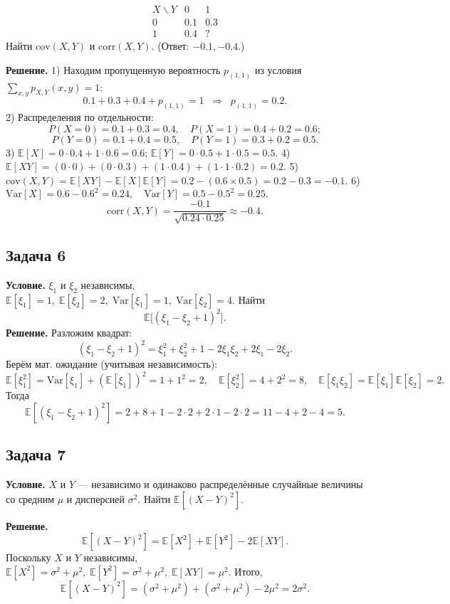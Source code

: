 \documentclass[12pt]{article}
\begin{document}
\[
\begin{array}{c|cc}
X\backslash Y & 0 & 1 \\
\hline
0 & 0.1 & 0.3 \\
1 & 0.4 & ? 
\end{array}
\]
Найти \(\mathrm{cov}(X, Y)\) и \(\mathrm{corr}(X, Y)\). (Ответ: \(-0.1, -0.4\).)

\textbf{Решение.}  
1) Находим пропущенную вероятность \(p_{(1,1)}\) из условия \(\sum_{x,y} p_{X,Y}(x,y)=1\):
\[
0.1 + 0.3 + 0.4 + p_{(1,1)} = 1 \;\;\Rightarrow\;\; p_{(1,1)}=0.2.
\]
2) Распределения по отдельности:
\[
P(X=0)=0.1+0.3=0.4,\quad P(X=1)=0.4+0.2=0.6;
\]
\[
P(Y=0)=0.1+0.4=0.5,\quad P(Y=1)=0.3+0.2=0.5.
\]
3) \(\mathbb{E}[X]=0\cdot0.4+1\cdot0.6=0.6\); \(\mathbb{E}[Y]=0\cdot0.5+1\cdot0.5=0.5\).  
4) \(\mathbb{E}[XY]= (0\cdot0)+(0\cdot0.3)+(1\cdot0.4)+(1\cdot1\cdot0.2)=0.2.\)  
5) \(\mathrm{cov}(X,Y) = \mathbb{E}[XY] - \mathbb{E}[X]\mathbb{E}[Y] = 0.2 - (0.6\times0.5)=0.2-0.3=-0.1.\)  
6) \(\mathrm{Var}[X]=0.6-0.6^2=0.24,\quad \mathrm{Var}[Y]=0.5-0.5^2=0.25.\)  
\[
\mathrm{corr}(X,Y)=\frac{-0.1}{\sqrt{0.24\cdot0.25}}\approx -0.4.
\]

\subsection*{Задача 6}
\textbf{Условие.} \(\xi_1\) и \(\xi_2\) независимы, \(\mathbb{E}[\xi_1]=1,\;\mathbb{E}[\xi_2]=2,\;\mathrm{Var}[\xi_1]=1,\;\mathrm{Var}[\xi_2]=4.\) Найти
\[
\mathbb{E}\bigl[(\xi_1-\xi_2+1)^2\bigr].
\]
\textbf{Решение.}  
Разложим квадрат:
\[
(\xi_1-\xi_2+1)^2=\xi_1^2+\xi_2^2+1-2\xi_1\xi_2+2\xi_1-2\xi_2.
\]
Берём мат. ожидание (учитывая независимость):
\[
\mathbb{E}[\xi_1^2]=\mathrm{Var}[\xi_1]+(\mathbb{E}[\xi_1])^2=1+1^2=2,\quad
\mathbb{E}[\xi_2^2]=4+2^2=8,\quad
\mathbb{E}[\xi_1\xi_2]=\mathbb{E}[\xi_1]\mathbb{E}[\xi_2]=2.
\]
Тогда
\[
\mathbb{E}[(\xi_1-\xi_2+1)^2]
=2+8+1-2\cdot2+2\cdot1-2\cdot2=11-4+2-4=5.
\]

\subsection*{Задача 7}
\textbf{Условие.} \(X\) и \(Y\) --- независимо и одинаково распределённые случайные величины со средним \(\mu\) и дисперсией \(\sigma^2\). Найти \(\mathbb{E}[(X-Y)^2]\).

\textbf{Решение.}  
\[
\mathbb{E}[(X-Y)^2]
= \mathbb{E}[X^2] + \mathbb{E}[Y^2] - 2\mathbb{E}[XY].
\]
Поскольку \(X\) и \(Y\) независимы,  
\(\mathbb{E}[X^2]=\sigma^2+\mu^2,\;\mathbb{E}[Y^2]=\sigma^2+\mu^2,\;\mathbb{E}[XY]=\mu^2.\)  
Итого,
\[
\mathbb{E}[(X-Y)^2]
= (\sigma^2+\mu^2) + (\sigma^2+\mu^2) - 2\mu^2
= 2\sigma^2.
\]
\end{document}
